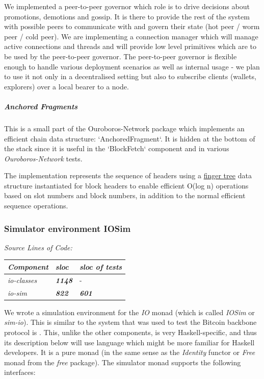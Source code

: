 \documentclass[11pt,a4paper]{article}
\begin{document}
We implemented a peer-to-peer governor which role is to drive decisions
about promotions, demotions and gossip. It is there to provide the rest
of the system with possible peers to communicate with and govern their
state (hot peer / worm peer / cold peer). We are implementing a
connection manager which will manage active connections and threads and
will provide low level primitives which are to be used by the
peer-to-peer governor. The peer-to-peer governor is flexible enough to
handle various deployment scenarios as well as internal usage - we plan
to use it not only in a decentralised setting but also to subscribe
clients (wallets, explorers) over a local bearer to a node.

\subparagraph{Anchored Fragments}
\label{anchored-fragments}

This is a small part of the Ouroboros-Network package which implements
an efficient chain data structure: `AnchoredFragment`.
It is hidden at the bottom of the stack since it is useful in the
`BlockFetch` component and in various \emph{Ouroboros-Network} tests.

The implementation represents the sequence of headers using a
\href{http://www.staff.city.ac.uk/~ross/papers/FingerTree.html}{finger
tree} data structure instantiated for block headers to enable efficient
O(log n) operations based on slot numbers and block numbers, in addition
to the normal efficient sequence operations.

\subsubsection{Simulator environment IOSim}
\label{simulator-environment-simm}

\emph{Source Lines of Code:\\
}

\begin{longtable}[]{@{}lll@{}}
\toprule
\emph{Component} & \emph{sloc} & \emph{sloc of tests}\tabularnewline
\midrule
\endhead
\emph{io-classes} & \emph{\textbf{1148}} & -\tabularnewline
\emph{io-sim} & \emph{\textbf{822}} & \emph{\textbf{601}}\tabularnewline
\bottomrule
\end{longtable}

We wrote a simulation environment for the \emph{IO} monad (which is
called \emph{IOSim} or \emph{sim-io}). This is similar to the system that
was used to test the Bitcoin backbone protocol is \cite{MJ15}. This,
unlike the other components, is very Haskell-specific, and thus its
description below will use language which might be more familiar for
Haskell developers. It is a pure monad (in the same sense as the
\emph{Identity} functor or \emph{Free} monad from the \emph{free}
package). The simulator monad supports the following interfaces:
\end{document}

